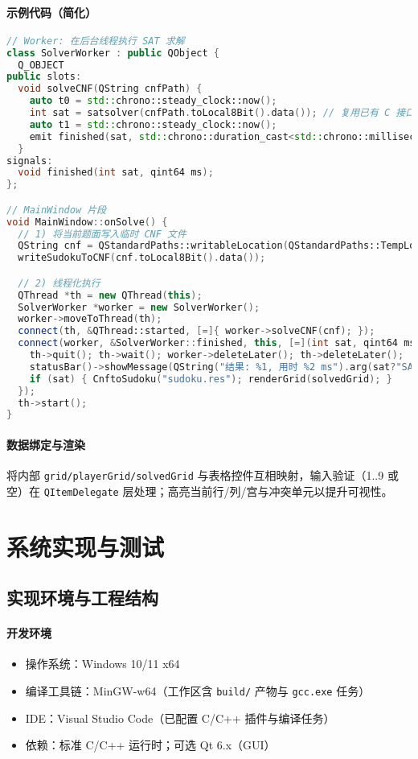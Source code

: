 \documentclass[UTF8]{ctexart}
\begin{document}
\paragraph{示例代码（简化）}
\begin{lstlisting}[language=C++]
// Worker: 在后台线程执行 SAT 求解
class SolverWorker : public QObject {
  Q_OBJECT
public slots:
  void solveCNF(QString cnfPath) {
    auto t0 = std::chrono::steady_clock::now();
    int sat = satsolver(cnfPath.toLocal8Bit().data()); // 复用已有 C 接口
    auto t1 = std::chrono::steady_clock::now();
    emit finished(sat, std::chrono::duration_cast<std::chrono::milliseconds>(t1-t0).count());
  }
signals:
  void finished(int sat, qint64 ms);
};

// MainWindow 片段
void MainWindow::onSolve() {
  // 1) 将当前题面写入临时 CNF 文件
  QString cnf = QStandardPaths::writableLocation(QStandardPaths::TempLocation) + "/sudoku.cnf";
  writeSudokuToCNF(cnf.toLocal8Bit().data());

  // 2) 线程化执行
  QThread *th = new QThread(this);
  SolverWorker *worker = new SolverWorker();
  worker->moveToThread(th);
  connect(th, &QThread::started, [=]{ worker->solveCNF(cnf); });
  connect(worker, &SolverWorker::finished, this, [=](int sat, qint64 ms){
    th->quit(); th->wait(); worker->deleteLater(); th->deleteLater();
    statusBar()->showMessage(QString("结果: %1, 用时 %2 ms").arg(sat?"SAT":"UNSAT").arg(ms));
    if (sat) { CnftoSudoku("sudoku.res"); renderGrid(solvedGrid); }
  });
  th->start();
}
\end{lstlisting}

\paragraph{数据绑定与渲染}
将内部 \texttt{grid/playerGrid/solvedGrid} 与表格控件互相映射，输入验证（1..9 或空）在 \texttt{QItemDelegate} 层处理；高亮当前行/列/宫与冲突单元以提升可视性。

\section{系统实现与测试}
\subsection{实现环境与工程结构}
\paragraph{开发环境}
\begin{itemize}
  \item 操作系统：Windows 10/11 x64
  \item 编译工具链：MinGW-w64（工作区含 \texttt{build/} 产物与 \texttt{gcc.exe} 任务）
  \item IDE：Visual Studio Code（已配置 C/C++ 插件与编译任务）
  \item 依赖：标准 C/C++ 运行时；可选 Qt 6.x（GUI）
\end{itemize}
\end{document}
